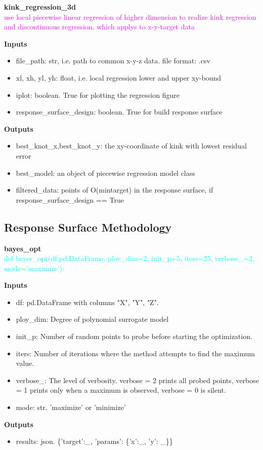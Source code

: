 \noindent\textbf{kink\_regression\_3d}\\
\textcolor{magenta}{use local piecewise linear regression of higher dimension to realize kink regression and discontinuous regression, which applys to x-y-target data}
\par\textbf{Inputs}
\begin{itemize}
    \item file\_path: str, i.e. path to common x-y-z data. file format: .csv
    \item xl, xh, yl, yh: float, i.e. local regression lower and upper xy\mbox{-}bound
    \item iplot: boolean. True for plotting the regression figure 
    \item response\_surface\_design: boolean. True for build response surface
\end{itemize}
\par\textbf{Outputs}
\begin{itemize}
    \item best\_knot\_x,best\_knot\_y: the xy-coordinate of kink with lowest residual error
    \item best\_model: an object of piecewise regression model class
    \item filtered\_data: points of O(min{target}) in the response surface, if response\_surface\_design == True
\end{itemize}


\subsection{Response Surface Methodology}
\textbf{bayes\_opt}\\
\textcolor{cyan}{def bayes\_opt(df:pd.DataFrame, ploy\_dim=2, init\_p=5, iters=25, verbose\_=2, mode='maximize'):}
\par\textbf{Inputs}
\begin{itemize}
    \item df: pd.DataFrame with columns "X", "Y", "Z".
    \item ploy\_dim: Degree of polynomial surrogate model
    \item init\_p: Number of random points to probe before starting the optimization.
    \item iters: Number of iterations where the method attempts to find the maximum value.
    \item verbose\_: The level of verbosity. verbose = 2 prints all probed points, verbose = 1 prints only when a maximum is observed, verbose = 0 is silent.
    \item mode: str. 'maximize' or 'minimize'
\end{itemize}
\par\textbf{Outputs}
\begin{itemize}
    \item results: json. \{'target':\_, 'params': \{'x':\_, 'y': \_\}\}
\end{itemize}

